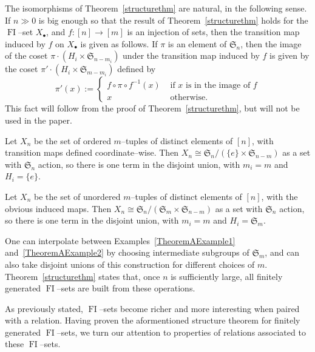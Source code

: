 \documentclass[ALCO,ThmDefs,Unicode,epreuves]{cedram}
\DeclareMathOperator{\FI}{FI}
\newcommand{\Sn}{\mathfrak{S}}
\newcommand{\dt}{\bullet}
\begin{document}
\begin{remark}
The isomorphisms of Theorem~\ref{structurethm} are natural, in the following sense. If $n \gg 0$ is big enough so that the result of Theorem~\ref{structurethm} holds for the $\FI$--set $X_\dt$, and $f:[n] \rightarrow [m]$ is an injection of sets, then the transition map induced by $f$ on $X_\dt$ is given as follows. If $\pi$ is an element of $\Sn_n$, then the image of the coset $\pi \cdot (H_i \times \Sn_{n-m_i})$ under the transition map induced by $f$ is given by the coset $\pi' \cdot(H_i \times \Sn_{m-m_i})$ defined by
\[
\pi'(x) := \begin{cases} f \circ \pi \circ f^{-1}(x) & \text{ if $x$ is in the image of $f$}\\ x & \text{ otherwise.}\end{cases}
\]
This fact will follow from the proof of Theorem~\ref{structurethm}, but will not be used in the paper.
\end{remark}

\begin{example} \label{TheoremAExample1}
Let $X_n$ be the set of ordered $m$--tuples of distinct elements of $[n]$, with transition maps defined coordinate--wise. Then $X_n \cong \Sn_n/(\{ e \} \times \Sn_{n-m} )$ as a set with $\Sn_n$ action, so there is one term in the disjoint union, with $m_i=m$ and $H_i = \{ e \}$.
\end{example}


\begin{example} \label{TheoremAExample2}
Let $X_n$ be the set of unordered $m$--tuples of distinct elements of $[n]$, with the obvious induced maps. Then $X_n \cong \Sn_n/(\Sn_m \times \Sn_{n-m} )$ as a set with $\Sn_n$ action, so there is one term in the disjoint union, with $m_i=m$ and $H_i = \Sn_m$.
\end{example}

One can interpolate between Examples~\ref{TheoremAExample1} and~\ref{TheoremAExample2} by choosing intermediate subgroups of $\Sn_m$, and can also take disjoint unions of this construction for different choices of $m$. Theorem~\ref{structurethm} states that, once $n$ is sufficiently large, all finitely generated $\FI$--sets are built from these operations.

As previously stated, $\FI$--sets become richer and more interesting when paired with a relation. Having proven the aformentioned structure theorem for finitely generated $\FI$--sets, we turn our attention to properties of relations associated to these $\FI$--sets.
\end{document}
